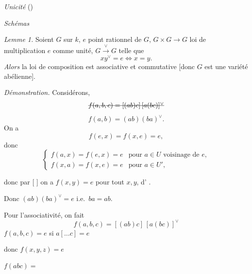 \documentclass[11pt,a4paper]{article}
\begin{document}


\emph{Unicité} (\struck{\ill{}})  \ \  \ill{} \ill{} 

\emph{Schémas}

\emph{Lemme 1.} Soient $G$   sur $k$, $e$ point rationnel de $G$, $G \times G \to G$ loi de multiplication   $e$ comme unité, $G \xrightarrow{\ \vee\ } G$   telle que
\[
  x y^{\vee} = e \iff x = y .
\]
\emph{Alors}  la loi de composition est associative et commutative [donc $G$ est une variété abélienne].

\emph{Démonstration.} Considérons,
\[
  \text{\struck{$f(a,b,c) = [(ab)c]\,[a(bc)]^{\vee}$}}
\]
\[
  f(a,b) = (ab)(ba)^{\vee} .
\]
On a
\[
  f(e, x) = f(x, e) = e ,
\]
donc
\[
  \begin{cases}
    f(a, x) = f(e, x) = e & \text{pour } a \in U \text{ voisinage de } e, \\
    f(x, a) = f(x, e) = e & \text{pour } a \in U',
  \end{cases}
\]

donc par \emph{} [\ill{} \ill{} \ill{}] on a $f(x, y) = e$ pour tout $x, y$, d' .

Donc $(ab)(ba)^{\vee} = e$ i.e.\ $ba = ab$.

Pour l'associativité, on fait
\[
  f(a,b,c) = [(ab)c]\,[a(bc)]^{\vee}
\]
 $f(a,b,c) = e$ si $a [\ldots c] = e$ \struck{\ill{} \ill{} \ill{}} 

donc $f(x, y, z) = e$

 $f(abc) =$
\end{document}
